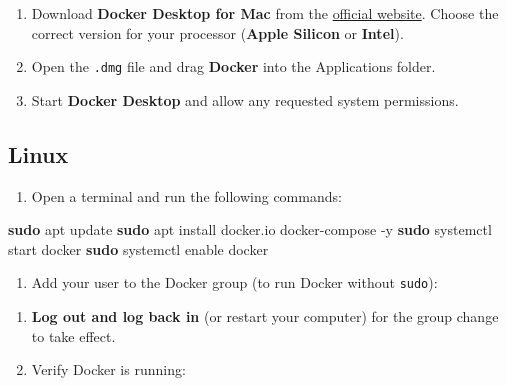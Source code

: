 \documentclass[
  10pt,
  b5paper,
  oneside]{book}
\newenvironment{Shaded}{\begin{snugshade}}{\end{snugshade}}
\newcommand{\AttributeTok}[1]{\textcolor[rgb]{0.13,0.29,0.53}{#1}}
\newcommand{\FunctionTok}[1]{\textcolor[rgb]{0.13,0.29,0.53}{\textbf{#1}}}
\newcommand{\NormalTok}[1]{#1}
\newcommand{\VariableTok}[1]{\textcolor[rgb]{0.00,0.00,0.00}{#1}}
\providecommand{\tightlist}{%
  \setlength{\itemsep}{0pt}\setlength{\parskip}{0pt}}
\begin{document}
\begin{enumerate}
\def\labelenumi{\arabic{enumi}.}
\tightlist
\item
  Download \textbf{Docker Desktop for Mac} from the \href{https://docs.docker.com/desktop/install/mac-install/}{official website}. Choose the correct version for your processor (\textbf{Apple Silicon} or \textbf{Intel}).
\item
  Open the \texttt{.dmg} file and drag \textbf{Docker} into the Applications folder.
\item
  Start \textbf{Docker Desktop} and allow any requested system permissions.
\end{enumerate}

\subsection{Linux}\label{linux}

\begin{enumerate}
\def\labelenumi{\arabic{enumi}.}
\tightlist
\item
  Open a terminal and run the following commands:
\end{enumerate}

\begin{Shaded}
\begin{Highlighting}[]
  \FunctionTok{sudo}\NormalTok{ apt update}
  \FunctionTok{sudo}\NormalTok{ apt install docker.io docker{-}compose }\AttributeTok{{-}y}
  \FunctionTok{sudo}\NormalTok{ systemctl start docker}
  \FunctionTok{sudo}\NormalTok{ systemctl enable docker}
\end{Highlighting}
\end{Shaded}

\begin{enumerate}
\def\labelenumi{\arabic{enumi}.}
\setcounter{enumi}{1}
\tightlist
\item
  Add your user to the Docker group (to run Docker without \texttt{sudo}):
\end{enumerate}

\begin{Shaded}
\end{Shaded}

\begin{enumerate}
\def\labelenumi{\arabic{enumi}.}
\setcounter{enumi}{2}
\item
  \textbf{Log out and log back in} (or restart your computer) for the group change to take effect.
\item
  Verify Docker is running:
\end{enumerate}
\end{document}
